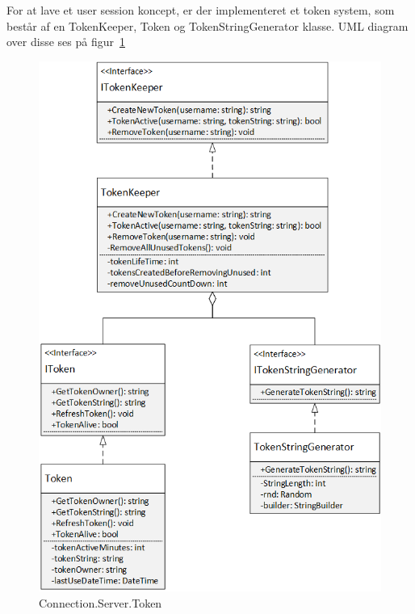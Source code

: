 For at lave et user session koncept, er der implementeret et token system, som består af en TokenKeeper, Token og TokenStringGenerator klasse. UML diagram over disse ses på figur~\ref{fig:ConnectionServerToken}
\begin{figure}
	\centering
	\includegraphics[width=0.7\linewidth]{figs/connection/ConnectionServerToken.png}
	\caption{Connection.Server.Token}
	\label{fig:ConnectionServerToken}
\end{figure}

